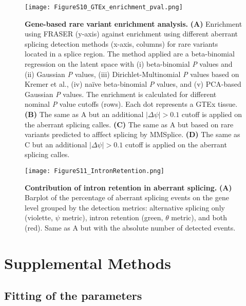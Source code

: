 \documentclass[a4paper,12pt]{article}
\begin{document}
\begin{figure}[h]
\centering
	\texttt{[image: FigureS10\_GTEx\_enrichment\_pval.png]}
	\caption{
	    \textbf{Gene-based rare variant enrichment analysis.}
	    \textbf{(A)} Enrichment using FRASER (y-axis) against enrichment using
different aberrant splicing detection methods (x-axis, columns) for rare variants
located in a splice region. The method applied are a beta-binomial regression on 
the latent space with (i) beta-binomial \textit{P} values and (ii) Gaussian
\textit{P} values, (iii) Dirichlet-Multinomial \textit{P} values based on
Kremer et al., (iv) naïve beta-binomial \textit{P} values, and (v) 
PCA-based Gaussian \textit{P} values. The enrichment is calculated for different 
nominal \textit{P} value cutoffs (rows). Each dot represents a GTEx tissue. 
\textbf{(B)} The same as A but an additional $|\Delta\psi| > 0.1$ cutoff is 
applied on the aberrant splicing calles. \textbf{(C)} The same as A but based on
rare variants predicted to afffect splicing by MMSplice. \textbf{(D)} The same
as C but an additional $|\Delta\psi| > 0.1$ cutoff is applied on the aberrant 
splicing calles.
}
\end{figure}
\pagebreak


\begin{figure}[h]
\centering
	\texttt{[image: FigureS11\_IntronRetention.png]}
	\caption{
	    \textbf{Contribution of intron retention in aberrant splicing.}
\textbf{(A)} Barplot of the percentage of aberrant splicing events on the gene level
grouped by the detection metrics: alternative splicing only (violette, $\psi$ metric), 
intron retention (green, $\theta$ metric), and both (red).  Same as A
but with the absolute number of detected events.
}
\end{figure}
\pagebreak


\FloatBarrier


\section{Supplemental Methods}

\subsection{Fitting of the parameters}






\end{document}
